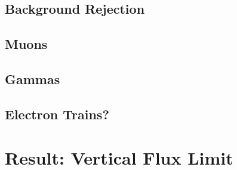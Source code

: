 \subsection{Background Rejection}
\subsection{Muons}
\subsection{Gammas}
\subsection{Electron Trains?}

\section{Result: Vertical Flux Limit}


